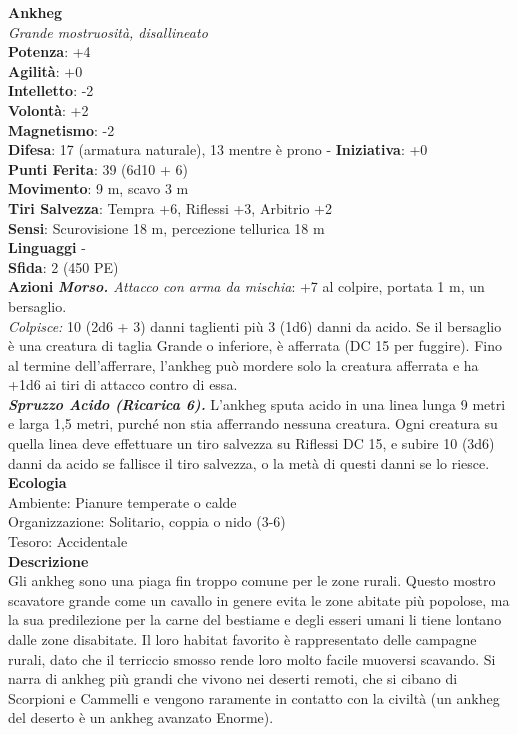 \begin{multicols}{2}
\medskip\textbf{Ankheg}\\
\emph{Grande mostruosità, disallineato}\\
\textbf{Potenza}: +4\\
\textbf{Agilità}: +0\\
\textbf{Intelletto}: -2\\
\textbf{Volontà}: +2\\
\textbf{Magnetismo}: -2\\
\textbf{Difesa}: 17 (armatura naturale), 13 mentre è prono - \textbf{Iniziativa}: +0\\
\textbf{Punti Ferita}: 39 (6d10 + 6)\\
\textbf{Movimento}: 9 m, scavo 3 m\\
\textbf{Tiri Salvezza}: Tempra +6, Riflessi +3, Arbitrio +2\\
\textbf{Sensi}: Scurovisione 18 m, percezione tellurica 18 m\\
\textbf{Linguaggi} -\\
\textbf{Sfida}: 2 (450 PE)\smallskip\\
\smallskip\textbf{Azioni}
\emph{\textbf{Morso.} Attacco con arma da mischia}: +7 al colpire, portata 1 m, un bersaglio.\\
\emph{Colpisce:} 10 (2d6 + 3) danni taglienti più 3 (1d6) danni da acido. Se il bersaglio è una creatura di taglia Grande o inferiore, è afferrata (DC  15 per fuggire). Fino al termine dell'afferrare, l'ankheg può mordere solo la creatura afferrata e ha +1d6 ai tiri di attacco contro di essa.\\
\emph{\textbf{Spruzzo Acido (Ricarica 6).}} L'ankheg sputa acido in una linea lunga 9 metri e larga 1,5 metri, purché non stia afferrando nessuna creatura. Ogni creatura su quella linea deve effettuare un tiro salvezza su Riflessi DC  15, e subire 10 (3d6) danni da acido se fallisce il tiro salvezza, o la metà di questi danni se lo riesce.\\
\textbf{Ecologia}\\
Ambiente: Pianure temperate o calde\\
Organizzazione: Solitario, coppia o nido (3-6)\\
Tesoro: Accidentale\\
\textbf{Descrizione}\\
Gli ankheg sono una piaga fin troppo comune per le zone rurali. Questo mostro scavatore grande come un cavallo in genere evita le zone abitate più popolose, ma la sua predilezione per la carne del bestiame e degli esseri umani li tiene lontano dalle zone disabitate. Il loro habitat favorito è rappresentato delle campagne rurali, dato che il terriccio smosso rende loro molto facile muoversi scavando. Si narra di ankheg più grandi che vivono nei deserti remoti, che si cibano di Scorpioni e Cammelli e vengono raramente in contatto con la civiltà (un ankheg del deserto è un ankheg avanzato Enorme).\\

\end{multicols}

